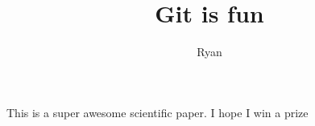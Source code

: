 \documentclass[10pt] {article}
\author{Ryan}
\title{Git is fun}
\begin{document}
	\maketile
	
	This is a super awesome scientific paper.
	I hope I win a prize
	
\end{document}
